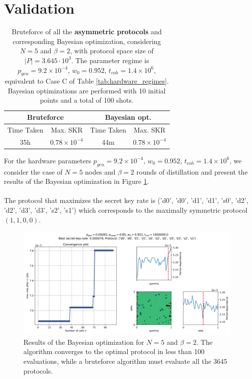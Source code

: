 \documentclass{article}
\begin{document}
\clearpage
\section*{Validation}

\begin{table}[ht!]
  \centering
  \begin{tabular}{|c|c|c|c|}
      \hline
      \multicolumn{2}{|c|}{Bruteforce} & \multicolumn{2}{c|}{Bayesian opt.} \\
      \hline
      Time Taken & Max. SKR & Time Taken & Max. SKR \\
      \hline
      \hline
      35h & $0.78 \times 10^{-4}$ & 44m & $0.78 \times 10^{-4}$ \\
      \hline
  \end{tabular}
  \caption{Bruteforce of all the \textbf{asymmetric protocols} and corresponding Bayesian optimization, considering $N=5$ and $\beta=2$, with protocol space size of $|P| = 3.645 \cdot 10^3$. The parameter regime is $p_{gen} = 9.2 \times 10^{-4}$, $w_0 = 0.952$, $t_{coh} = 1.4 \times 10^6$, equivalent to Case C of Table \ref{tab:hardware_regimes}. Bayesian optimizations are performed with 10 initial points and a total of 100 shots.}
  \label{tab:validation_regimes}
\end{table}

For the hardware parameters $p_{gen} = 9.2 \times 10^{-4}$, $w_0 = 0.952$, $t_{coh} = 1.4 \times 10^6$, we consider the case of $N=5$ nodes and $\beta=2$ rounds of distillation and present the results of the Bayesian optimization in Figure \ref{fig:gp_validation}.
\\\\
The protocol that maximizes the secret key rate is
  ('d0', 'd0', 'd1', 'd1', 's0', 'd2', 'd2', 'd3', 'd3', 's2', 's1')
which corresponds to the maximally symmetric protocol $(1,1,0,0)$.

\begin{figure}[ht!]
  \centering
  \includegraphics[width=\linewidth, trim=10 10 10 40, clip]{asymmetric/gp5,2/skopt_gp.png}
  \caption{Results of the Bayesian optimization for $N=5$ and $\beta=2$. The algorithm converges to the optimal protocol in less than 100 evaluations, while a bruteforce algorithm must evaluate all the 3645 protocols.}
  \label{fig:gp_validation}
\end{figure}
\end{document}
